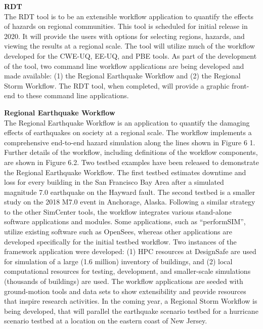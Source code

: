 \noindent\textbf{RDT} \\The RDT tool is to be an extensible workflow application to quantify the effects of hazards on regional communities. This tool is scheduled for initial release in 2020. It will provide the users with options for selecting regions, hazards, and viewing the results at a regional scale. The tool will utilize much of the workflow developed for the CWE-UQ, EE-UQ, and PBE tools. As part of the development of the tool, two command line workflow applications are being developed and made available: (1) the Regional Earthquake Workflow and (2) the Regional Storm Workflow. The RDT tool, when completed, will provide a graphic front-end to these command line applications.
\newline

\noindent\textbf{Regional Earthquake Workflow} \\The Regional Earthquake Workflow is an application to quantify the damaging effects of earthquakes on society at a regional scale. The workflow implements a comprehensive end-to-end hazard simulation along the lines shown in Figure 6 1. Further details of the workflow, including definitions of the workflow components, are shown in Figure 6.2. Two testbed examples have been released to demonstrate the Regional Earthquake Workflow. The first testbed estimates downtime and loss for every building in the San Francisco Bay Area after a simulated magnitude 7.0 earthquake on the Hayward fault. The second testbed is a smaller study on the 2018 M7.0 event in Anchorage, Alaska. Following a similar strategy to the other SimCenter tools, the workflow integrates various stand-alone software applications and modules. Some applications, such as “performSIM”, utilize existing software such as OpenSees, whereas other applications are developed specifically for the initial testbed workflow. Two instances of the framework application were developed:        (1) HPC resources at DesignSafe are used for simulation of a large (1.6 million) inventory of buildings, and (2) local computational resources for testing, development, and smaller-scale simulations (thousands of buildings) are used. The workflow applications are seeded with ground-motion tools and data sets to show extensibility and provide resources that inspire research activities. In the coming year, a Regional Storm Workflow is being developed, that will parallel the earthquake scenario testbed for a hurricane scenario testbed at a location on the eastern coast of New Jersey.
\newline

